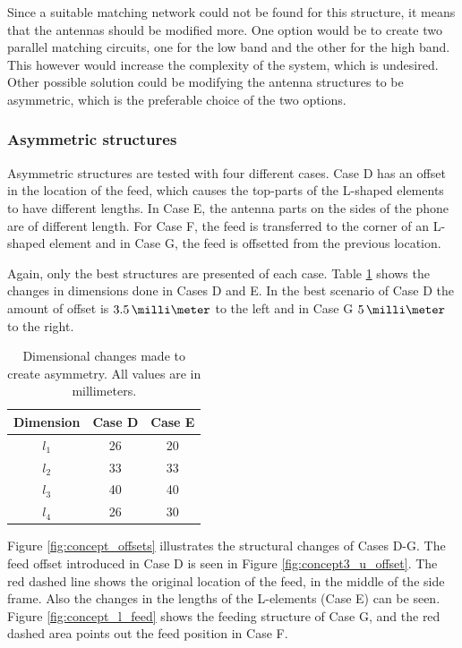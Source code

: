 Since a suitable matching network could not be found for this structure, it means that the antennas should be modified more. One option would be to create two parallel matching circuits, one for the low band and the other for the high band. This however would increase the complexity of the system, which is undesired. Other possible solution could be modifying the antenna structures to be asymmetric, which is the preferable choice of the two options.


\subsubsection{Asymmetric structures}
\label{sec:asymmetric_structures}
Asymmetric structures are tested with four different cases. Case D has an offset in the location of the feed, which causes the top-parts of the L-shaped elements to have different lengths. In Case E, the antenna parts on the sides of the phone are of different length. For Case F, the feed is transferred to the corner of an L-shaped element and in Case G, the feed is offsetted from the previous location.

Again, only the best structures are presented of each case. Table \ref{tab:concept3} shows the changes in dimensions done in Cases D and E. In the best scenario of Case D the amount of offset is $3.5\,\milli\meter$ to the left and in Case G $5\,\milli\meter$ to the right. 
\begin{table}[H]
    \vspace{-6pt}
    \centering
    \caption{Dimensional changes made to create asymmetry. All values are in millimeters.}
    \label{tab:concept3}
    \vspace{-5pt}
    \begin{tabular}{|c|c|c|}
        \hline
        \textbf{Dimension} & \textbf{Case D} & \textbf{Case E}\\
        \hline
        $l_1$ & 26 & 20 \\
        \hline
        $l_2$ & 33 & 33\\
        \hline
        $l_3$ & 40 & 40\\
        \hline
        $l_4$ & 26 & 30\\
        \hline
    \end{tabular}
\end{table}

Figure \ref{fig:concept_offsets} illustrates the structural changes of Cases D-G. The feed offset introduced in Case D is seen in Figure \ref{fig:concept3_u_offset}. The red dashed line shows the original location of the feed, in the middle of the side frame. Also the changes in the lengths of the L-elements (Case E) can be seen. Figure \ref{fig:concept_l_feed} shows the feeding structure of Case G, and the red dashed area points out the feed position in Case F.

